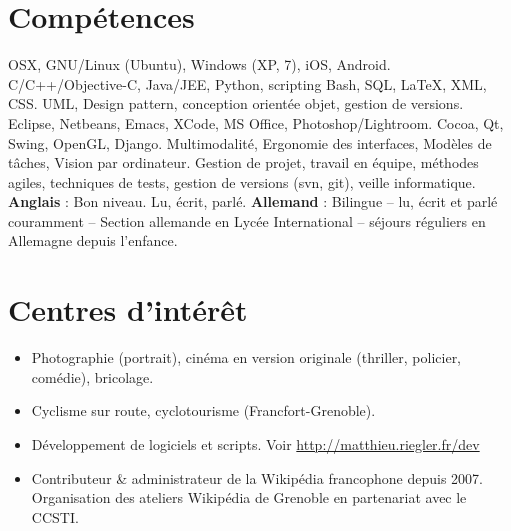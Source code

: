 \documentclass[11pt,a4paper]{moderncv}
\begin{document}
   \section{Compétences}
    {OSX, GNU/Linux (Ubuntu), Windows (XP, 7), iOS, Android.}
    {C/C++/Objective-C, Java/JEE, Python, scripting Bash, SQL, LaTeX, XML, CSS.}
    {UML, Design pattern, conception orientée objet, gestion de versions.}
    {Eclipse, Netbeans, Emacs, XCode, MS Office, Photoshop/Lightroom.}
    {Cocoa, Qt, Swing, OpenGL, Django.}
    {Multimodalité, Ergonomie des interfaces, Modèles de tâches, Vision par ordinateur.}
    {Gestion de projet, travail en équipe, méthodes agiles, techniques de tests, gestion de versions (svn, git), veille informatique.}
    {\textbf{Anglais} : Bon niveau. Lu, écrit, parlé.\newline{}%
   \textbf{Allemand} : Bilingue – lu, écrit et parlé couramment – Section allemande en Lycée International – séjours réguliers en Allemagne depuis l'enfance.}

   \section{Centres d'intérêt}
   \begin{itemize}
      \item {Photographie (portrait), cinéma en version originale (thriller, policier, comédie), bricolage.}
      \item {Cyclisme sur route, cyclotourisme (Francfort-Grenoble).}
      \item {Développement de logiciels et scripts. Voir \url{http://matthieu.riegler.fr/dev} }
      \item {Contributeur \& administrateur de la Wikipédia francophone depuis 2007. Organisation des ateliers Wikipédia de Grenoble en partenariat avec le CCSTI.}
   \end{itemize}
\end{document}
